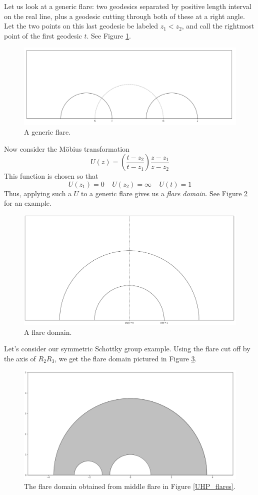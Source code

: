\documentclass[]{article}
\begin{document}
Let us look at a generic flare: two geodesics separated by positive length interval on the real line, plus a geodesic cutting through both of these at a right angle.
Let the two points on this last geodesic be labeled $z_1 < z_2$, and call the rightmost point of the first geodesic $t$.
See Figure \ref{pre_flare}.
\begin{figure}[h]
	\centering
	\includegraphics[width=0.6\linewidth]{../labeled_pre_flare.png}
	\caption{A generic flare.}
	\label{pre_flare}
\end{figure}
Now consider the M\"obius transformation
$$
U(z) = \left( \frac{t - z_2}{t - z_1} \right) \frac{z - z_1}{z - z_2}
$$
This function is chosen so that
$$
U(z_1) = 0 ~~~~~ U(z_2) = \infty ~~~~~ U(t) = 1
$$
Thus, applying such a $U$ to a generic flare gives us a \textit{flare domain}.
See Figure \ref{post_flare} for an example.
\begin{figure}[h]
	\centering
	\includegraphics[width=0.6\linewidth]{../labeled_flare.png}
	\caption{A flare domain.}
	\label{post_flare}
\end{figure}

Let's consider our symmetric Schottky group example.
Using the flare cut off by the axis of $R_2R_3$, we get the flare domain pictured in Figure \ref{flare}.
\begin{figure}[h]
	\centering
	\includegraphics[width=0.6\linewidth]{../flare.png}
	\caption{The flare domain obtained from middle flare in Figure \ref{UHP_flares}.}
	\label{flare}
\end{figure}
\end{document}
